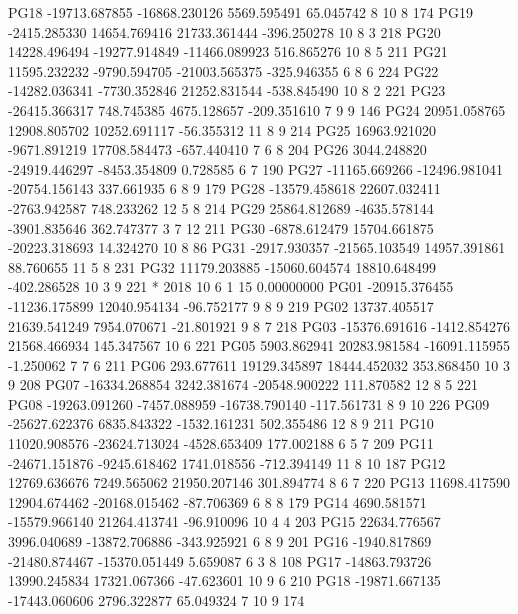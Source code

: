 PG18 -19713.687855 -16868.230126   5569.595491     65.045742  8 10  8 174       
PG19  -2415.285330  14654.769416  21733.361444   -396.250278 10  8  3 218       
PG20  14228.496494 -19277.914849 -11466.089923    516.865276 10  8  5 211       
PG21  11595.232232  -9790.594705 -21003.565375   -325.946355  6  8  6 224       
PG22 -14282.036341  -7730.352846  21252.831544   -538.845490 10  8  2 221       
PG23 -26415.366317    748.745385   4675.128657   -209.351610  7  9  9 146       
PG24  20951.058765  12908.805702  10252.691117    -56.355312 11  8  9 214       
PG25  16963.921020  -9671.891219  17708.584473   -657.440410  7  6  8 204       
PG26   3044.248820 -24919.446297  -8453.354809      0.728585  6     7 190       
PG27 -11165.669266 -12496.981041 -20754.156143    337.661935  6  8  9 179       
PG28 -13579.458618  22607.032411  -2763.942587    748.233262 12  5  8 214       
PG29  25864.812689  -4635.578144  -3901.835646    362.747377  3  7 12 211       
PG30  -6878.612479  15704.661875 -20223.318693     14.324270 10  8     86       
PG31  -2917.930357 -21565.103549  14957.391861     88.760655 11  5  8 231       
PG32  11179.203885 -15060.604574  18810.648499   -402.286528 10  3  9 221       
*  2018 10  6  1 15  0.00000000
PG01 -20915.376455 -11236.175899  12040.954134    -96.752177  9  8  9 219       
PG02  13737.405517  21639.541249   7954.070671    -21.801921  9  8  7 218       
PG03 -15376.691616  -1412.854276  21568.466934    145.347567 10  6    221       
PG05   5903.862941  20283.981584 -16091.115955     -1.250062  7  7  6 211       
PG06    293.677611  19129.345897  18444.452032    353.868450 10  3  9 208       
PG07 -16334.268854   3242.381674 -20548.900222    111.870582 12  8  5 221       
PG08 -19263.091260  -7457.088959 -16738.790140   -117.561731  8  9 10 226       
PG09 -25627.622376   6835.843322  -1532.161231    502.355486 12  8  9 211       
PG10  11020.908576 -23624.713024  -4528.653409    177.002188  6  5  7 209       
PG11 -24671.151876  -9245.618462   1741.018556   -712.394149 11  8 10 187       
PG12  12769.636676   7249.565062  21950.207146    301.894774  8  6  7 220       
PG13  11698.417590  12904.674462 -20168.015462    -87.706369  6  8  8 179       
PG14   4690.581571 -15579.966140  21264.413741    -96.910096 10  4  4 203       
PG15  22634.776567   3996.040689 -13872.706886   -343.925921  6  8  9 201       
PG16  -1940.817869 -21480.874467 -15370.051449      5.659087  6  3  8 108       
PG17 -14863.793726  13990.245834  17321.067366    -47.623601 10  9  6 210       
PG18 -19871.667135 -17443.060606   2796.322877     65.049324  7 10  9 174       
